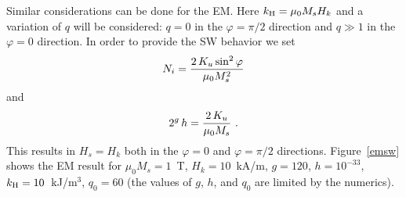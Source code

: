 \documentclass[../main.tex]{subfiles}
\begin{document}
Similar considerations can be done for the EM. Here $k_{\rm H}=\mu_0M_sH_k$ and a variation of $q$ will be considered: $q=0$ in the
$\varphi=\pi/2$ direction and $q\gg1$ in the $\varphi=0$ direction. In order to provide the SW behavior we set
\begin{equation}
  N_i = {2\,K_u \sin^2\varphi\over \mu_0 M_s^2}
\end{equation}
and
\begin{equation}
  2^g\,h = {2\,K_u \over \mu_0 M_s} \ .
\end{equation}
This results in $H_s=H_k$ both in the $\varphi=0$ and $\varphi=\pi/2$
directions. Figure~\ref{emsw} shows the EM result for $\mu_0M_s=1$~T,
$H_k=10$~kA/m, $g=120$, $h=10^{-33}$, $k_{\rm H}=10$~kJ/m$^3$, $q_0=60$ (the
values of $g$, $h$, and $q_0$ are limited by the numerics).

\cleardoublepage
\end{document}
